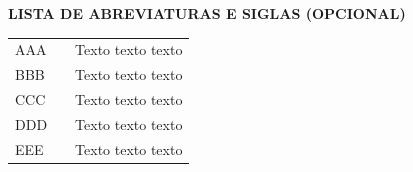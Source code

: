 
\begin{center}
    \textbf{LISTA DE ABREVIATURAS E SIGLAS (OPCIONAL)}
    \vspace{1cm}
\end{center}

\begin{table}[h]
    \begin{tabular}{lcl}
        AAA & \hspace{0.5cm} & Texto texto texto \\
        BBB & \hspace{0.5cm} & Texto texto texto \\
        CCC & \hspace{0.5cm} & Texto texto texto \\
        DDD & \hspace{0.5cm} & Texto texto texto \\
        EEE & \hspace{0.5cm} & Texto texto texto
    \end{tabular}
\end{table}

